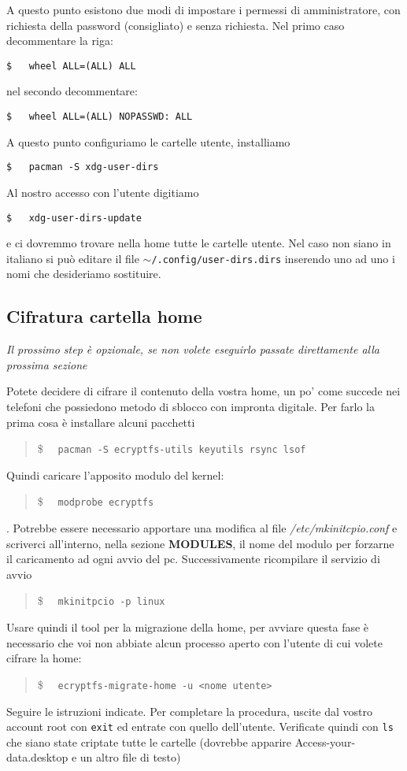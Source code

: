 \documentclass[twoside,italian]{book}
\newcommand{\code}[1]{\texttt{#1}}
\newcommand{\shellcode}[1]{\$$\quad$ \texttt{#1}}
\newcommand{\centcode}[1]{
	\begin{quote}
		\color{code}
		\shellcode{#1}
	\end{quote}
}
\begin{document}
    A questo punto esistono due modi di impostare i permessi di amministratore, con richiesta della password (consigliato) e senza richiesta.
    Nel primo caso decommentare la riga:
    \begin{lstlisting}
$   wheel ALL=(ALL) ALL
    \end{lstlisting}
    nel secondo decommentare: 
    \begin{lstlisting}
$   wheel ALL=(ALL) NOPASSWD: ALL
    \end{lstlisting}

    A questo punto configuriamo le cartelle utente, installiamo 
    \begin{lstlisting}
$   pacman -S xdg-user-dirs
    \end{lstlisting}
    Al nostro accesso con l'utente digitiamo 
    \begin{lstlisting}
$   xdg-user-dirs-update
    \end{lstlisting}
    e ci dovremmo trovare nella home tutte le cartelle utente. Nel caso non siano in italiano si può editare il file \texttt{$\sim$/.config/user-dirs.dirs} inserendo uno ad uno i nomi che desideriamo sostituire.
    
    \subsection*{Cifratura cartella home}
    \textit{Il prossimo step è opzionale, se non volete eseguirlo passate direttamente alla prossima sezione}
    
    Potete decidere di cifrare il contenuto della vostra home, un po' come succede nei telefoni che possiedono metodo di sblocco con impronta digitale. Per farlo la prima cosa è installare alcuni pacchetti \centcode{pacman -S ecryptfs-utils keyutils rsync lsof}
    Quindi caricare l'apposito modulo del kernel:\centcode{modprobe ecryptfs}. Potrebbe essere necessario apportare una modifica al file \textit{/etc/mkinitcpio.conf} e scriverci all'interno, nella sezione \textbf{MODULES}, il nome del modulo per forzarne il caricamento ad ogni avvio del pc. Successivamente ricompilare il servizio di avvio \centcode{mkinitpcio -p linux}Usare quindi il tool per la migrazione della home, per avviare questa fase è necessario che voi non abbiate alcun processo aperto con l'utente di cui volete cifrare la home: \centcode{ecryptfs-migrate-home -u <nome utente>}
    Seguire le istruzioni indicate. Per completare la procedura, uscite dal vostro account root con \code{exit} ed entrate con quello dell'utente. Verificate quindi con \code{ls} che siano state criptate tutte le cartelle (dovrebbe apparire Access-your-data.desktop e un altro file di testo)
\end{document}
